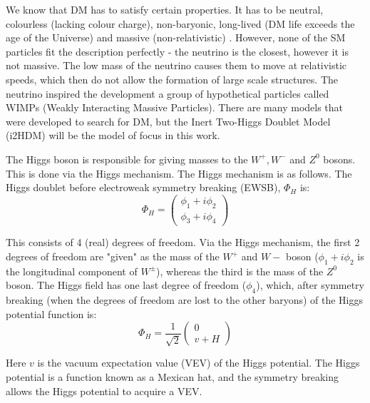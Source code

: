 \documentclass[12pt]{article}
\begin{document}
We know that DM has to satisfy certain properties. It has to be neutral, colourless (lacking colour charge), non-baryonic, long-lived (DM life exceeds the age of the Universe) and massive (non-relativistic) \cite{ZACEK_2007, DeLuca2018, gondolo2004introductionnonbaryonicdarkmatter}. However, none of the SM particles fit the description perfectly - the neutrino is the closest, however it is not massive. The low mass of the neutrino causes them to move at relativistic speeds, which then do not allow the formation of large scale structures. The neutrino inspired the development a group of hypothetical particles called WIMPs (Weakly Interacting Massive Particles). There are many models that were developed to search for DM, but the Inert Two-Higgs Doublet Model (i2HDM) will be the model of focus in this work. 

The Higgs boson is responsible for giving masses to the $W^+, W^-$ and $Z^0$ bosons. This is done via the Higgs mechanism. The Higgs mechanism is as follows.
The Higgs doublet before electroweak symmetry breaking (EWSB), $\Phi_H$ is:
\begin{equation}
    \Phi_H =
    \begin{pmatrix}
        {\phi_1 + i\phi_2} \\
        {\phi_3 + i\phi_4}
    \end{pmatrix}
\end{equation}

This consists of 4 (real) degrees of freedom. Via the Higgs mechanism, the first 2 degrees of freedom are "given" as the mass of the $W^+$ and $W-$ boson ($\phi_1 + i\phi_2$ is the longitudinal component of $W^\pm$), whereas the third is the mass of the $Z^0$ boson. The Higgs field has one last degree of freedom ($\phi_4$), which, after symmetry breaking (when the degrees of freedom are lost to the other baryons) of the Higgs potential function is: 
\begin{equation}
    \Phi_H = \frac{1}{\sqrt{2}}
    \begin{pmatrix}
        {0} \\
        {v + H}
    \end{pmatrix}
\end{equation}

Here $v$ is the vacuum expectation value (VEV) of the Higgs potential. The Higgs potential is a function known as a Mexican hat, and the symmetry breaking allows the Higgs potential to acquire a VEV.
\end{document}
